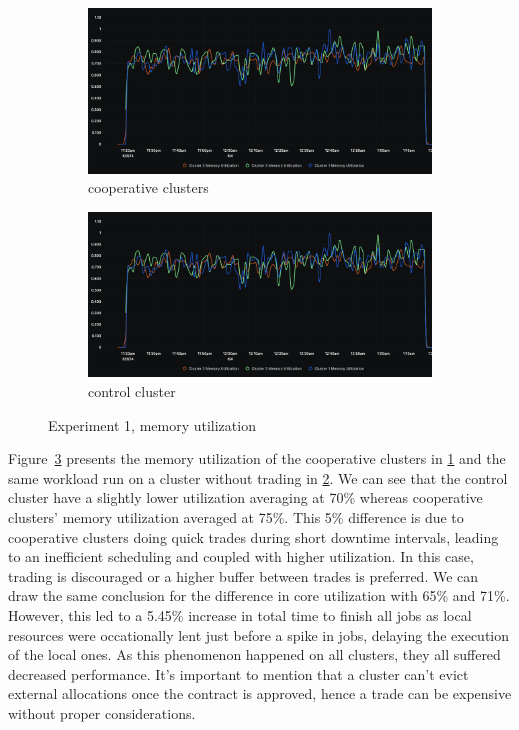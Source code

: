 \begin{figure}[H]
\centering
\begin{subfigure}{.5\textwidth}
  \centering
  \includegraphics[width=.9\linewidth]{./figures/experiment-one/exp-one.png}
  \caption{cooperative clusters}
  \label{fig:exp1coop}
\end{subfigure}%
\begin{subfigure}{.5\textwidth}
  \centering
  \includegraphics[width=.9\linewidth]{./figures/experiment-one/exp-one-control.png}
  \caption{control cluster}
  \label{fig:exp1control}
\end{subfigure}
\caption{Experiment 1, memory utilization}
\label{fig:exp1memutil}
\end{figure}

Figure~\ref{fig:exp1memutil} presents the memory utilization of the cooperative
clusters in \ref{fig:exp1coop} and the same workload run on a cluster without
trading in \ref{fig:exp1control}.
We can see that the control cluster have a slightly lower utilization averaging
at 70\% whereas cooperative clusters' memory utilization averaged at 75\%. This
5\% difference is due to cooperative clusters doing quick trades during short
downtime intervals, leading to an inefficient scheduling and coupled with
higher utilization. In this case, trading is discouraged or a higher buffer
between trades is preferred. We can draw the same conclusion for the difference
in core utilization with 65\% and 71\%. However, this led to a 5.45\% increase
in total time to finish all jobs as local resources were occationally lent
just before a spike in jobs, delaying the execution of the local ones. As this
phenomenon happened on all clusters, they all suffered decreased performance.
It's important to mention that a cluster can't evict external allocations once
the contract is approved, hence a trade can be expensive without proper
considerations.

